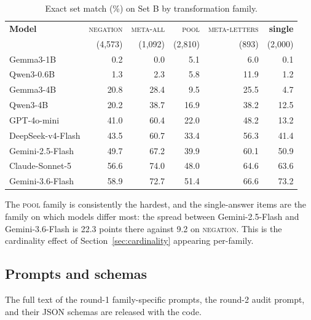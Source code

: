 \documentclass{article} %
\begin{document}
\begin{table}[h]
\caption{Exact set match (\%) on Set B by transformation family.}
\label{tab:family-acc}
\begin{center}
\begin{small}
\begin{tabular}{lrrrrr}
\toprule
\textbf{Model} & \textsc{negation} & \textsc{meta-all} & \textsc{pool} &
\textsc{meta-letters} & \textbf{single} \\
& (4,573) & (1,092) & (2,810) & (893) & (2,000) \\
\midrule
Gemma3-1B          &  0.2 &  0.0 &  5.1 &  6.0 &  0.1 \\
Qwen3-0.6B         &  1.3 &  2.3 &  5.8 & 11.9 &  1.2 \\
Gemma3-4B          & 20.8 & 28.4 &  9.5 & 25.5 &  4.7 \\
Qwen3-4B           & 20.2 & 38.7 & 16.9 & 38.2 & 12.5 \\
GPT-4o-mini        & 41.0 & 60.4 & 22.0 & 48.2 & 13.2 \\
DeepSeek-v4-Flash  & 43.5 & 60.7 & 33.4 & 56.3 & 41.4 \\
Gemini-2.5-Flash   & 49.7 & 67.2 & 39.9 & 60.1 & 50.9 \\
Claude-Sonnet-5    & 56.6 & 74.0 & 48.0 & 64.6 & 63.6 \\
Gemini-3.6-Flash   & 58.9 & 72.7 & 51.4 & 66.6 & 73.2 \\
\bottomrule
\end{tabular}
\end{small}
\end{center}
\end{table}

The \textsc{pool} family is consistently the hardest, and the single-answer items are the
family on which models differ most: the spread between Gemini-2.5-Flash and
Gemini-3.6-Flash is 22.3 points there against 9.2 on \textsc{negation}. This is the
cardinality effect of Section~\ref{sec:cardinality} appearing per-family.

\subsection{Prompts and schemas}

The full text of the round-1 family-specific prompts, the round-2 audit prompt, and their
JSON schemas are released with the code.
\end{document}
